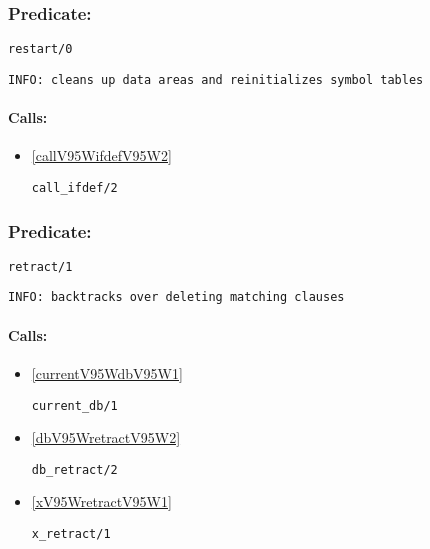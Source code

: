 \subsubsection{Predicate:} \label{restartV95W0}

\begin{verbatim}
restart/0
\end{verbatim}

{\small \begin{verbatim}
INFO: cleans up data areas and reinitializes symbol tables

\end{verbatim}}
\paragraph{Calls:} 
\begin{itemize}
\item \ref{callV95WifdefV95W2} 
\begin{verbatim}
call_ifdef/2
\end{verbatim}

\end{itemize}

\subsubsection{Predicate:} \label{retractV95W1}

\begin{verbatim}
retract/1
\end{verbatim}

{\small \begin{verbatim}
INFO: backtracks over deleting matching clauses

\end{verbatim}}
\paragraph{Calls:} 
\begin{itemize}
\item \ref{currentV95WdbV95W1} 
\begin{verbatim}
current_db/1
\end{verbatim}

\item \ref{dbV95WretractV95W2} 
\begin{verbatim}
db_retract/2
\end{verbatim}

\item \ref{xV95WretractV95W1} 
\begin{verbatim}
x_retract/1
\end{verbatim}

\end{itemize}

